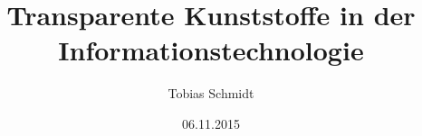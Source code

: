 \documentclass[11pt,a4paper]{article}
\begin{document}
\title{Transparente Kunststoffe in der Informationstechnologie}
\author{Tobias Schmidt}
\subject{CHEMIE}
\date{06.11.2015}
\maketitle












\newpage
\makelastpage
\end{document}
